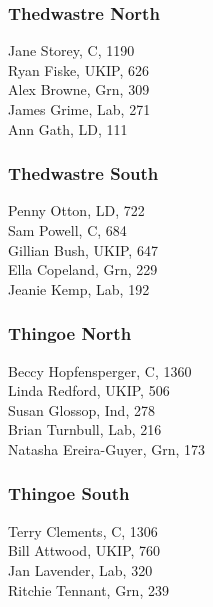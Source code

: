\documentclass[a4paper,openany,10pt]{book}
\begin{document}
\subsubsection*{Thedwastre North}



Jane Storey, C, 1190\\
Ryan Fiske, UKIP, 626\\
Alex Browne, Grn, 309\\
James Grime, Lab, 271\\
Ann Gath, LD, 111\\


\subsubsection*{Thedwastre South}



Penny Otton, LD, 722\\
Sam Powell, C, 684\\
Gillian Bush, UKIP, 647\\
Ella Copeland, Grn, 229\\
Jeanie Kemp, Lab, 192\\


\subsubsection*{Thingoe North}



Beccy Hopfensperger, C, 1360\\
Linda Redford, UKIP, 506\\
Susan Glossop, Ind, 278\\
Brian Turnbull, Lab, 216\\
Natasha Ereira-Guyer, Grn, 173\\


\subsubsection*{Thingoe South}



Terry Clements, C, 1306\\
Bill Attwood, UKIP, 760\\
Jan Lavender, Lab, 320\\
Ritchie Tennant, Grn, 239\\
\end{document}

